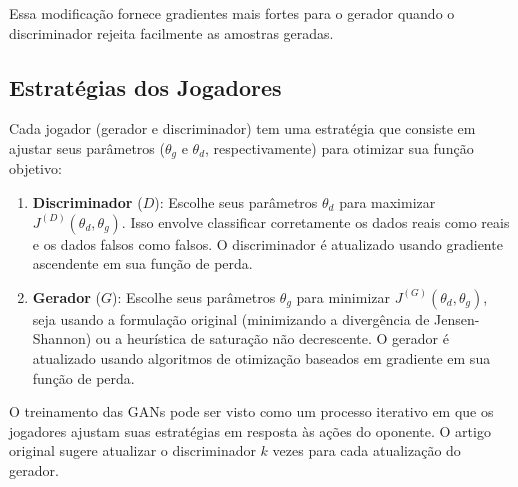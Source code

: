 \documentclass{tufte-handout}
\let\subsubsection\subsection
\begin{document}
Essa modificação fornece gradientes mais fortes para o gerador quando o discriminador rejeita facilmente as amostras geradas.

\subsubsection{Estratégias dos Jogadores}

Cada jogador (gerador e discriminador) tem uma estratégia que consiste em ajustar seus parâmetros ($\theta_g$ e $\theta_d$, respectivamente) para otimizar sua função objetivo:

\begin{enumerate}
    \item \textbf{Discriminador} ($D$): Escolhe seus parâmetros $\theta_d$ para maximizar $J^{(D)}(\theta_d, \theta_g)$. Isso envolve classificar corretamente os dados reais como reais e os dados falsos como falsos. O discriminador é atualizado usando gradiente ascendente em sua função de perda.
    \item \textbf{Gerador} ($G$): Escolhe seus parâmetros $\theta_g$ para minimizar $J^{(G)}(\theta_d, \theta_g)$, seja usando a formulação original (minimizando a divergência de Jensen-Shannon) ou a heurística de saturação não decrescente. O gerador é atualizado usando algoritmos de otimização baseados em gradiente em sua função de perda.
\end{enumerate}

O treinamento das GANs pode ser visto como um processo iterativo em que os jogadores ajustam suas estratégias em resposta às ações do oponente. O artigo original sugere atualizar o discriminador $k$ vezes para cada atualização do gerador.
\end{document}

